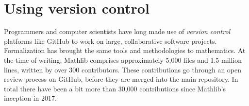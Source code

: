 \documentclass[11pt]{article}
\newcommand{\todo}[1]{\textcolor{errorcolor}{#1}}
\begin{document}





\section*{Using version control}


Programmers and computer scientists have long made use of
\emph{version control} platforms like GitHub to work on large, collaborative software projects.
Formalization has brought the same tools and methodologies to mathematics.
At the time of writing, Mathlib comprises approximately 5,000 files and 1.5 million lines,
written by over 300 contributors.
These contributions go through an open review process on GitHub,
before they are merged into the main repository.
In total there have been a bit more than 30,000 contributions
since Mathlib's inception in 2017.
\end{document}

